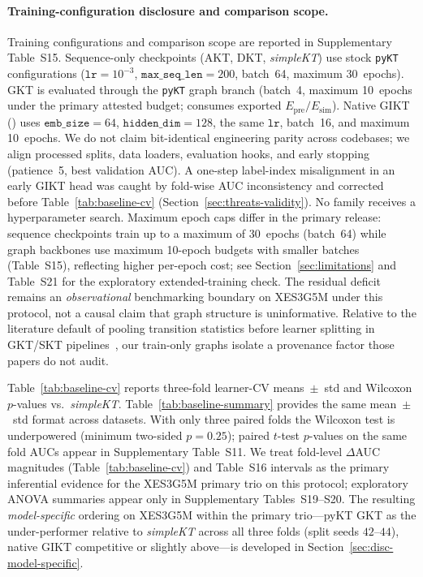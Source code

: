 \documentclass[preprint,10pt,doubleblind]{elsarticle}
\newcommand{\Epre}{\ensuremath{E_{\text{pre}}}}
\newcommand{\Esim}{\ensuremath{E_{\text{sim}}}}
\begin{document}
\paragraph{Training-configuration disclosure and comparison scope.}
Training configurations and comparison scope are reported in
Supplementary Table~S15.
Sequence-only checkpoints (AKT, DKT, \textit{simpleKT}) use stock
\texttt{pyKT} configurations ($\texttt{lr}{=}10^{-3}$,
$\texttt{max\_seq\_len}{=}200$, batch~64, maximum 30~epochs). GKT is evaluated
through the \texttt{pyKT} graph branch (batch~4, maximum 10~epochs under the
primary attested budget; consumes exported $\Epre/\Esim$). Native GIKT
() uses $\texttt{emb\_size}{=}64$,
$\texttt{hidden\_dim}{=}128$, the same $\texttt{lr}$, batch~16, and
maximum 10~epochs. We do not claim bit-identical engineering parity across codebases;
we align processed splits, data loaders, evaluation hooks, and early stopping
(patience~5, best validation AUC). A one-step label-index misalignment in an
early GIKT head was caught by fold-wise AUC inconsistency and corrected before
Table~\ref{tab:baseline-cv} (Section~\ref{sec:threats-validity}). No family
receives a hyperparameter search. Maximum epoch caps differ in the primary release:
sequence checkpoints train up to a maximum of 30~epochs (batch~64) while graph backbones
use maximum 10-epoch budgets with smaller batches (Table~S15), reflecting higher
per-epoch cost; see Section~\ref{sec:limitations} and Table~S21 for the
exploratory extended-training check.
The residual deficit remains an \emph{observational} benchmarking boundary on
XES3G5M under this protocol, not a causal claim that graph structure is
uninformative. Relative to the literature default of pooling transition statistics before
learner splitting in GKT/SKT pipelines~\cite{nakagawa2019gkt,tong2020skt}, our
train-only graphs isolate a provenance factor those papers do not audit.


Table~\ref{tab:baseline-cv} reports three-fold learner-CV means~$\pm$~std and
Wilcoxon $p$-values vs.\ \textit{simpleKT}. Table~\ref{tab:baseline-summary}
provides the same mean~$\pm$~std format across datasets. With only three paired
folds the Wilcoxon test is underpowered (minimum two-sided $p{=}0.25$); paired
$t$-test $p$-values on the same fold AUCs appear in Supplementary Table~S11.
We treat fold-level $\Delta$AUC magnitudes (Table~\ref{tab:baseline-cv}) and
Table~S16 intervals as the primary inferential evidence for the XES3G5M primary
trio on this protocol; exploratory ANOVA summaries appear only in Supplementary
Tables~S19--S20. The resulting \emph{model-specific} ordering on XES3G5M within
the primary trio---pyKT GKT as the under-performer relative to
\textit{simpleKT} across all three folds (split seeds $42$--$44$), native GIKT competitive or
slightly above---is developed in Section~\ref{sec:disc-model-specific}.
\end{document}
